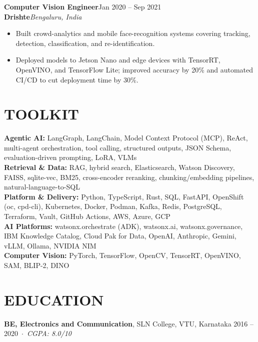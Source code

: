 \documentclass[letterpaper,10pt]{article}
\newcommand{\role}[4]{%
  \textbf{#1}\hfill{\color{muted}\small #2}\\[1pt]
  {\color{accent}\bfseries #3}\hfill{\color{muted}\small\itshape #4}\vspace{3pt}
}
\begin{document}
\vspace{8pt}

\role{Computer Vision Engineer}{Jan 2020 -- Sep 2021}{Drishte}{Bengaluru, India}
\begin{itemize}[itemsep=3pt]
  \item Built crowd-analytics and mobile face-recognition systems covering tracking, detection,
        classification, and re-identification.
  \item Deployed models to Jetson Nano and edge devices with TensorRT, OpenVINO, and TensorFlow Lite;
        improved accuracy by 20\% and automated CI/CD to cut deployment time by 30\%.
\end{itemize}

\section*{TOOLKIT}
{\color{accent}\bfseries Agentic AI:} LangGraph, LangChain, Model Context Protocol (MCP), ReAct, multi-agent orchestration,
tool calling, structured outputs, JSON Schema, evaluation-driven prompting, LoRA, VLMs\\[2pt]
{\color{accent}\bfseries Retrieval \& Data:} RAG, hybrid search, Elasticsearch, Watson Discovery, FAISS, sqlite-vec, BM25,
cross-encoder reranking, chunking/embedding pipelines, natural-language-to-SQL\\[2pt]
{\color{accent}\bfseries Platform \& Delivery:} Python, TypeScript, Rust, SQL, FastAPI, OpenShift (oc, cpd-cli), Kubernetes,
Docker, Podman, Kafka, Redis, PostgreSQL, Terraform, Vault, GitHub Actions, AWS, Azure, GCP\\[2pt]
{\color{accent}\bfseries AI Platforms:} watsonx.orchestrate (ADK), watsonx.ai, watsonx.governance, IBM Knowledge Catalog,
Cloud Pak for Data, OpenAI, Anthropic, Gemini, vLLM, Ollama, NVIDIA NIM\\[2pt]
{\color{accent}\bfseries Computer Vision:} PyTorch, TensorFlow, OpenCV, TensorRT, OpenVINO, SAM, BLIP-2, DINO

\section*{EDUCATION}
\textbf{BE, Electronics and Communication}, SLN College, VTU, Karnataka \hfill 2016 -- 2020 \,$\cdot$\, \textit{CGPA: 8.0/10}
\end{document}
